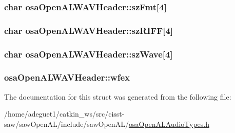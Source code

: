 \hypertarget{structosa_open_a_l_w_a_v_header_a33de8f968564c7835cda9715a9f51956}{
\subsubsection[{sz\-Fmt}]{\setlength{\rightskip}{0pt plus 5cm}char osa\-Open\-A\-L\-W\-A\-V\-Header\-::sz\-Fmt\mbox{[}4\mbox{]}}}\label{structosa_open_a_l_w_a_v_header_a33de8f968564c7835cda9715a9f51956}
\hypertarget{structosa_open_a_l_w_a_v_header_a098b6f18d3e7817dfeba64ae1494d0f2}{
\subsubsection[{sz\-R\-I\-F\-F}]{\setlength{\rightskip}{0pt plus 5cm}char osa\-Open\-A\-L\-W\-A\-V\-Header\-::sz\-R\-I\-F\-F\mbox{[}4\mbox{]}}}\label{structosa_open_a_l_w_a_v_header_a098b6f18d3e7817dfeba64ae1494d0f2}
\hypertarget{structosa_open_a_l_w_a_v_header_a00ca16e2cba4d79c653c1a0d49ca4661}{
\subsubsection[{sz\-Wave}]{\setlength{\rightskip}{0pt plus 5cm}char osa\-Open\-A\-L\-W\-A\-V\-Header\-::sz\-Wave\mbox{[}4\mbox{]}}}\label{structosa_open_a_l_w_a_v_header_a00ca16e2cba4d79c653c1a0d49ca4661}
\hypertarget{structosa_open_a_l_w_a_v_header_a1bb12a739dfc5150d78795214c528d8a}{
\subsubsection[{wfex}]{ osa\-Open\-A\-L\-W\-A\-V\-Header\-::wfex}}\label{structosa_open_a_l_w_a_v_header_a1bb12a739dfc5150d78795214c528d8a}


The documentation for this struct was generated from the following file\-:\begin{DoxyCompactItemize}
\item 
/home/adeguet1/catkin\-\_\-ws/src/cisst-\/saw/saw\-Open\-A\-L/include/saw\-Open\-A\-L/\hyperlink{osa_open_a_l_audio_types_8h}{osa\-Open\-A\-L\-Audio\-Types.\-h}\end{DoxyCompactItemize}
